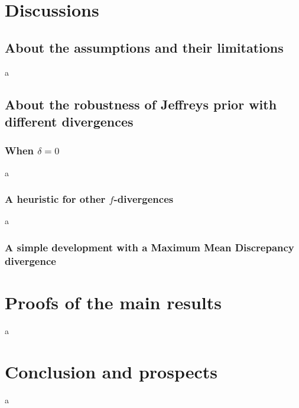 \section{Discussions}

    \subsection{About the assumptions and their limitations}

    a

    \subsection{About the robustness of Jeffreys prior with different divergences}


        \subsubsection{When $\delta=0$}

        a
        \subsubsection{A heuristic for other $f$-divergences}

        a
        \subsubsection{A simple development with a Maximum Mean Discrepancy divergence}

\section{Proofs of the main results}

a

\section{Conclusion and prospects}

a












